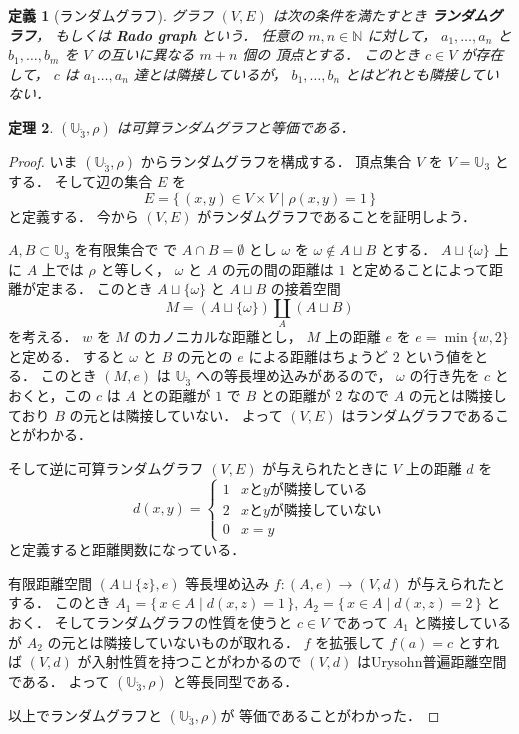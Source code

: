 \documentclass[leqno, 12pt]{jsarticle}
\newtheorem{thm}{定理}[section]
\newtheorem{df}[thm]{定義}
\newcommand{\nn}{\mathbb{N}}
\begin{document}
\begin{df}[ランダムグラフ]\label{df:rand:randomgraph}
グラフ
$(V, E)$
は次の条件を満たすとき
\textbf{ランダムグラフ}，
もしくは
\textbf{Rado graph}
という．
任意の
$m, n\in \nn$
に対して，
$a_{1}, \dots, a_{n}$
と
$b_{1}, \dots, b_{m}$
を
$V$
の互いに異なる
$m+n$
個の
頂点とする．
このとき
$c\in V$
が存在して，
$c$
は
$a_{1}\dots, a_{n}$
達とは隣接しているが，
$b_{1}, \dots, b_{n}$
とはどれとも隣接していない．
\end{df}

\begin{thm}\label{thm:rand:radograph}
$(\mathbb{U}_{\breve{3}}, \rho)$
は可算ランダムグラフと等価である．
\end{thm}
\begin{proof}
いま
$(\mathbb{U}_{\breve{3}}, \rho)$
からランダムグラフを構成する．
頂点集合
$V$
を
$V=\mathbb{U}_{3}$
とする．
そして辺の集合
$E$
を
\[
E=\{\, (x, y)\in V\times V\mid \rho(x, y)=1\, \}
\]
と定義する．
今から
$(V, E)$
がランダムグラフであることを証明しよう．



$A, B\subset \mathbb{U}_{3}$
を有限集合で
で
$A\cap B=\emptyset$
とし
$\omega$
を
$\omega\not\in A\sqcup B$
とする．
$A\sqcup \{\omega\}$
上に
$A$
上では
$\rho$
と等しく，
$\omega$
と
$A$
の元の間の距離は
$1$
と定めることによって距離が定まる．
このとき
$A\sqcup \{\omega\}$
と
$A\sqcup B$
の接着空間
\[
M=(A\sqcup\{\omega\})\coprod_{A}(A\sqcup B)
\]
を考える．
$w$
を
$M$
のカノニカルな距離とし，
$M$
上の距離
$e$
を
$e=\min\{w, 2\}$
と定める．
すると
$\omega$
と
$B$
の元との
$e$
による距離はちょうど
$2$
という値をとる．
このとき
$(M, e)$
は
$\mathbb{U}_{\breve{3}}$
への等長埋め込みがあるので，
$\omega$
の行き先を
$c$
とおくと，この
$c$
は
$A$
との距離が
$1$
で
$B$
との距離が
$2$
なので
$A$
の元とは隣接しており
$B$
の元とは隣接していない．
よって
$(V, E)$
はランダムグラフであることがわかる．

そして逆に可算ランダムグラフ
$(V, E)$
が与えられたときに
$V$
上の距離
$d$
を
\[
d(x, y)=
\begin{cases}
	1 & \text{$x$と$y$が隣接している}\\
	2 & \text{$x$と$y$が隣接していない}\\
	0 & \text{$x=y$}
\end{cases}
\]
と定義すると距離関数になっている．


有限距離空間
$(A\sqcup\{z\}, e)$
等長埋め込み
$f\colon  (A, e)\to (V, d)$
が与えられたとする．
このとき
$A_{1}=\{\, x\in A\mid d(x, z)=1\, \}$, 
$A_{2}=\{\, x\in A\mid d(x, z)=2\, \}$
とおく．
そしてランダムグラフの性質を使うと
$c\in V$
であって
$A_{1}$
と隣接しているが
$A_{2}$
の元とは隣接していないものが取れる．
$f$
を拡張して
$f(a)=c$
とすれば
$(V, d)$
が入射性質を持つことがわかるので
$(V, d)$
はUrysohn普遍距離空間である．
よって
$(\mathbb{U}_{\breve{3}}, \rho)$
と等長同型である．




以上でランダムグラフと
$(\mathbb{U}_{\breve{3}}, \rho)$が
等価であることがわかった．
\end{proof}
\end{document}
